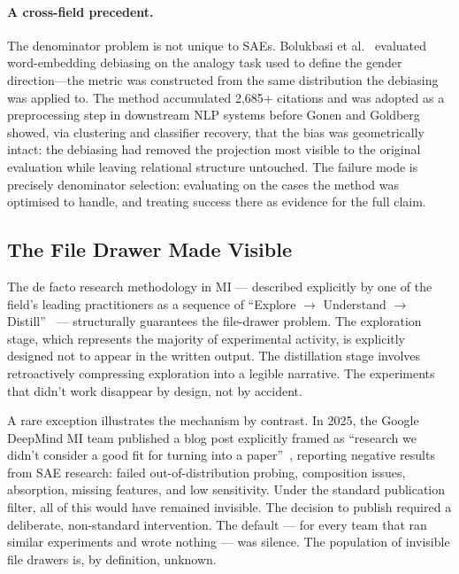 \documentclass{article}
\begin{document}
\paragraph{A cross-field precedent.} The denominator problem is not unique to SAEs. Bolukbasi et al.\ \citep{bolukbasi_man_2016} evaluated word-embedding debiasing on the analogy task used to define the gender direction---the metric was constructed from the same distribution the debiasing was applied to. The method accumulated 2,685+ citations and was adopted as a preprocessing step in downstream NLP systems before Gonen and Goldberg \citep{gonen_lipstick_2019} showed, via clustering and classifier recovery, that the bias was geometrically intact: the debiasing had removed the projection most visible to the original evaluation while leaving relational structure untouched. The failure mode is precisely denominator selection: evaluating on the cases the method was optimised to handle, and treating success there as evidence for the full claim.

\subsection{The File Drawer Made Visible}

The de facto research methodology in MI --- described explicitly by one of the field's leading practitioners as a sequence of ``Explore $\to$ Understand $\to$ Distill''~\citep{nanda_research_process_2023} --- structurally guarantees the file-drawer problem. The exploration stage, which represents the majority of experimental activity, is explicitly designed not to appear in the written output. The distillation stage involves retroactively compressing exploration into a legible narrative. The experiments that didn't work disappear by design, not by accident.

A rare exception illustrates the mechanism by contrast. In 2025, the Google DeepMind MI team published a blog post explicitly framed as ``research we didn't consider a good fit for turning into a paper''~\citep{smith_gdm_negative_2025}, reporting negative results from SAE research: failed out-of-distribution probing, composition issues, absorption, missing features, and low sensitivity. Under the standard publication filter, all of this would have remained invisible. The decision to publish required a deliberate, non-standard intervention. The default --- for every team that ran similar experiments and wrote nothing --- was silence. The population of invisible file drawers is, by definition, unknown.
\end{document}
